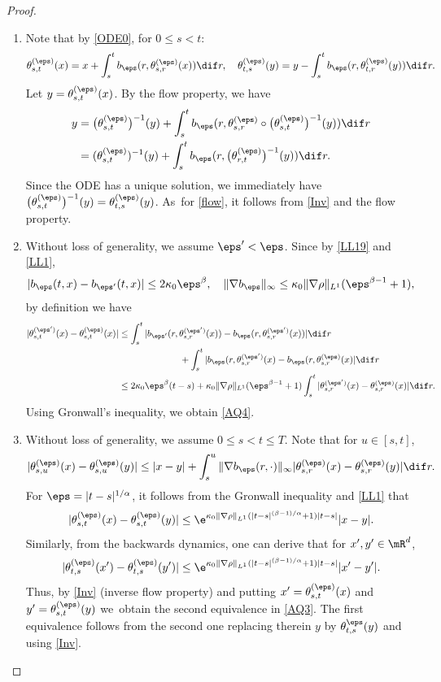 \begin{proof}
\begin{enumerate}
\item
Note that by \eqref{ODE0}, for $0\le s<t $:
\[
\theta_{s,t}^{(\eps)}(x)=x+\int^t_s{b_{\eps}}(r,\theta_{s,r}^{(\eps)}(x))\dif r,\quad \theta_{t,s}^{(\eps)}(y)=y-\int^t_s{b_{\eps}}(r,\theta_{t,r}^{(\eps)}(y))\dif r.
\]
Let $y=\theta_{s,t}^{(\eps)}(x)$. By the flow property, we have
\begin{align*}
y&=\bigl(\theta_{s,t}^{(\eps)}\bigr)^{-1}(y)+\int^t_s{b_{\eps}}(r,\theta_{s,r}^{(\eps)}\circ\bigl(\theta_{s,t}^{(\eps)}\bigr)^{-1}(y))\dif r\\
&=(\theta_{s,t}^{(\eps)})^{-1}(y)+\int^t_s{b_{\eps}}(r,\bigl(\theta_{r,t}^{(\eps)}\bigr)^{-1}(y))\dif r.
\end{align*}
Since the ODE has a unique solution, we immediately have $\bigl(\theta_{s,t}^{(\eps)}\bigr)^{-1}(y)=\theta_{t,s}^{(\eps)}(y)$. As~for \eqref{flow}, it follows from \eqref{Inv}
and the flow property.

\item
Without loss of generality, we assume $\eps'<\eps$. Since by \eqref{LL19} and \eqref{LL1},
\begin{equation}\label{LL2}
|b_\eps(t,x)-b_{\eps'}(t,x)|\leq 2\kappa_0\eps^\beta,\quad \|\nabla b_\eps\|_\infty\leq \kappa_0\|\nabla\rho\|_{L^1}(\eps^{\beta-1}+1),
\end{equation}
by definition we have
\begin{align*}
|\theta^{(\eps')}_{s,t}(x)-\theta^{(\eps)}_{s,t}(x)|
&\leq\int^t_s |b_{\eps'}(r,\theta^{(\eps')}_{s,r}(x))-b_{\eps}(r,\theta^{(\eps')}_{s,r}(x))|\dif r
\\&\hspace*{2.35cm}+\int^t_s |b_{\eps}(r,\theta^{(\eps')}_{s,r}(x)-b_{\eps}(r,\theta^{(\eps)}_{s,r}(x)|\dif r
\\&\leq 2\kappa_0\eps^\beta(t-s)+\kappa_0\|\nabla\rho\|_{L^1}(\eps^{\beta-1}+1)\int^t_s |\theta^{(\eps')}_{s,r}(x)-\theta^{(\eps)}_{s,r}(x)|\dif r.
\end{align*}
Using Gronwall's inequality, we obtain \eqref{AQ4}.

\item
Without loss of generality, we assume $0\leq s<t\leq T$.
Note that for $u\in[s,t]$,
\[
|\theta^{(\eps)}_{s,u}(x)-\theta^{(\eps)}_{s,u}(y)|\leq |x-y|+\int^u_s\|\nabla b_\eps(r,\cdot)\|_\infty|\theta^{(\eps)}_{s,r}(x)-\theta^{(\eps)}_{s,r}(y)|\dif r.
\]
For $\eps=|t-s|^{1/\alpha}$, it follows from the Gronwall inequality and \eqref{LL1} that
\[
|\theta^{(\eps)}_{s,t}(x)-\theta^{(\eps)}_{s,t}(y)|\leq \e^{\kappa_0\|\nabla\rho\|_{L^1}(|t-s|^{(\beta-1)/\alpha}+1)|t-s|}|x-y|.
\]
Similarly, from the backwards dynamics, one can derive that for {$x',y'\in \mR^d $,
\[
|\theta^{(\eps)}_{t,s}({x'})-\theta^{(\eps)}_{t,s}({y'})|\leq \e^{\kappa_0\|\nabla\rho\|_{L^1}(|t-s|^{(\beta-1)/\alpha}+1)|t-s|}|{x'-y'}|.
\]
Thus, by \eqref{Inv} {(inverse flow property)} and putting $x'=\theta^{(\eps)}_{{s,t}}(x)$ and $y'=\theta^{(\eps)}_{{s,t}}(y)$ we~obtain the second equivalence in \eqref{AQ3}.
The first equivalence follows from the second one replacing therein $y $ by $\theta_{t,s}^{\eps}(y) $ and using \eqref{Inv}}.\qedhere
\end{enumerate}
\end{proof}

